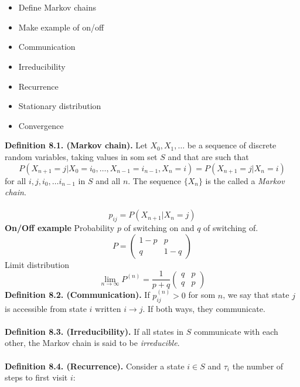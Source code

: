 \documentclass[12pt,a4paper]{report}
\author{Frederik Appel Vardinghus-Nielsen}
\begin{document}
\\\\
\begin{itemize}
\setlength\itemsep{0em}
\item Define Markov chains
\item Make example of on/off
\item Communication
\item Irreducibility
\item Recurrence
\item Stationary distribution
\item Convergence
\end{itemize}
\textbf{Definition 8.1. (Markov chain).} Let $X_0,X_1,\ldots$ be a sequence of discrete random variables, taking values in som set $S$ and that are such that
\begin{equation}
P(X_{n+1}=j|X_0=i_0,\ldots,X_{n-1}=i_{n-1},X_n=i)=P(X_{n+1}=j|X_n=i)
\end{equation}
for all $i,j,i_0,\ldots i_{n-1}$ in $S$ and all $n$. The sequence $\{X_n\}$ is the called a \textit{Markov chain}.\\\\
\begin{equation}
p_{ij}=P(X_{n+1}|X_n=j)
\end{equation}
\textbf{On/Off example} Probability $p$ of switching on and $q$ of switching of.
\begin{equation}
P=\begin{pmatrix}
1-p&p\\
q&1-q
\end{pmatrix}
\end{equation}
Limit distribution
\begin{equation}
\lim_{n\to\infty}P^{(n)}=\frac{1}{p+q}\begin{pmatrix}q&p\\q&p\end{pmatrix}
\end{equation}
\textbf{Definition 8.2. (Communication).} If $p_{ij}^{(n)}>0$ for som $n$, we say that state $j$ is accessible from state $i$ written $i\to j$. If both ways, they communicate.\\\\
\textbf{Definition 8.3. (Irreducibility).} If all states in $S$ communicate with each other, the Markov chain is said to be \textit{irreducible}.\\\\
\textbf{Definition 8.4. (Recurrence).} Consider a state $i\in S$ and $\tau_i$ the number of steps to first visit $i$:
\end{document}
